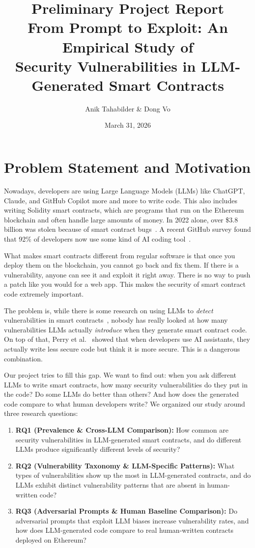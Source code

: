 \documentclass[11pt]{article}
\title{\textbf{Preliminary Project Report}\\[0.3cm]
\Large From Prompt to Exploit: An Empirical Study of\\Security Vulnerabilities in LLM-Generated Smart Contracts}
\author{Anik Tahabilder \& Dong Vo}
\date{March 31, 2026}
\begin{document}
\maketitle

\section{Problem Statement and Motivation}

Nowadays, developers are using Large Language Models (LLMs) like ChatGPT, Claude, and GitHub Copilot more and more to write code. This also includes writing Solidity smart contracts, which are programs that run on the Ethereum blockchain and often handle large amounts of money. In 2022 alone, over \$3.8 billion was stolen because of smart contract bugs~\cite{chainalysis2023}. A recent GitHub survey found that 92\% of developers now use some kind of AI coding tool~\cite{github_copilot}.

What makes smart contracts different from regular software is that once you deploy them on the blockchain, you cannot go back and fix them. If there is a vulnerability, anyone can see it and exploit it right away. There is no way to push a patch like you would for a web app. This makes the security of smart contract code extremely important.

The problem is, while there is some research on using LLMs to \emph{detect} vulnerabilities in smart contracts~\cite{gptscan, david2023you}, nobody has really looked at how many vulnerabilities LLMs actually \emph{introduce} when they generate smart contract code. On top of that, Perry et al.~\cite{perry2023users} showed that when developers use AI assistants, they actually write less secure code but think it is more secure. This is a dangerous combination.

Our project tries to fill this gap. We want to find out: when you ask different LLMs to write smart contracts, how many security vulnerabilities do they put in the code? Do some LLMs do better than others? And how does the generated code compare to what human developers write? We organized our study around three research questions:

\begin{enumerate}[leftmargin=*]
    \item \textbf{RQ1 (Prevalence \& Cross-LLM Comparison):} How common are security vulnerabilities in LLM-generated smart contracts, and do different LLMs produce significantly different levels of security?
    \item \textbf{RQ2 (Vulnerability Taxonomy \& LLM-Specific Patterns):} What types of vulnerabilities show up the most in LLM-generated contracts, and do LLMs exhibit distinct vulnerability patterns that are absent in human-written code?
    \item \textbf{RQ3 (Adversarial Prompts \& Human Baseline Comparison):} Do adversarial prompts that exploit LLM biases increase vulnerability rates, and how does LLM-generated code compare to real human-written contracts deployed on Ethereum?
\end{enumerate}
\end{document}
